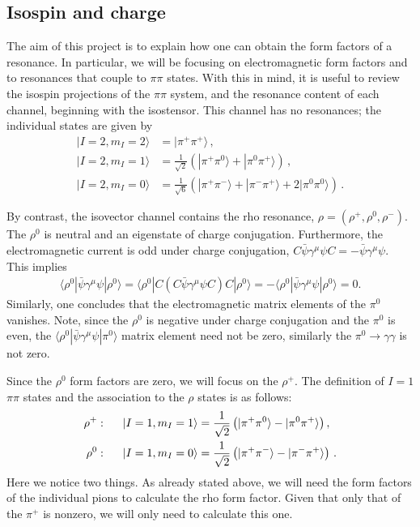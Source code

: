 \subsection{Isospin and charge}

The aim of this project is to explain how one can obtain the form factors of a resonance. In particular, we will be focusing on electromagnetic form factors and to resonances that couple to $\pi\pi$ states. With this in mind, it is useful to review the isospin projections of the $\pi\pi$ system, and the resonance content of each channel, beginning with the isostensor. This channel has no resonances; the individual states are given by
\begin{align}
|I=2,m_I=2\rangle&=|\pi^+\pi^+\rangle \,,\\
|I=2,m_I=1\rangle&=\frac{1}{\sqrt{2}}\left(|\pi^+\pi^0\rangle+|\pi^0\pi^+\rangle\right) \,,\\
|I=2,m_I=0\rangle&=\frac{1}{\sqrt{6}}\left(|\pi^+\pi^-\rangle+|\pi^-\pi^+\rangle+2|\pi^0\pi^0\rangle\right) \,.
\end{align}

By contrast, the isovector channel contains the rho resonance, $\rho=(\rho^+,\rho^0,\rho^-)$. The $\rho^0$ is neutral and an eigenstate of charge conjugation. Furthermore, the electromagnetic current is odd under charge conjugation, $C\bar{\psi}\gamma^\mu \psi C=-\bar{\psi}\gamma^\mu \psi$. This implies 
\begin{align}
\langle \rho^0|\bar{\psi}\gamma^\mu \psi | \rho^0\rangle
=
\langle \rho^0|C(C\bar{\psi}\gamma^\mu \psi C)C| \rho^0\rangle
=
-\langle \rho^0|\bar{\psi}\gamma^\mu \psi | \rho^0\rangle=0.
\end{align}
Similarly, one concludes that the electromagnetic matrix elements of the $\pi^0$ vanishes. Note, since the $\rho^0$ is negative under charge conjugation and the $\pi^0$ is even, the $\langle \rho^0|\bar{\psi}\gamma^\mu \psi | \pi^0\rangle$ matrix element need not be zero, similarly the $\pi^0\to\gamma\gamma$ is not zero.

 Since the $\rho^0$ form factors are zero, we will focus on the $\rho^+$. The definition of $I=1$ $\pi\pi$ states and the association to the $\rho$ states is as follows:
\begin{align}
\rho^+:\hspace{.5cm}|I=1,m_I=1\rangle&=\frac{1}{\sqrt{2}}\left(|\pi^+\pi^0\rangle-|\pi^0\pi^+\rangle\right),\\
\rho^0:\hspace{.5cm}|I=1,m_I=0\rangle&=\frac{1}{\sqrt{2}}\left(|\pi^+\pi^-\rangle-|\pi^-\pi^+\rangle\right) \,.
\end{align}
Here we notice two things. As already stated above, we will need the form factors of the individual pions to calculate the rho form factor. Given that only that of the $\pi^+$ is nonzero, we will only need to calculate this one. 
 

